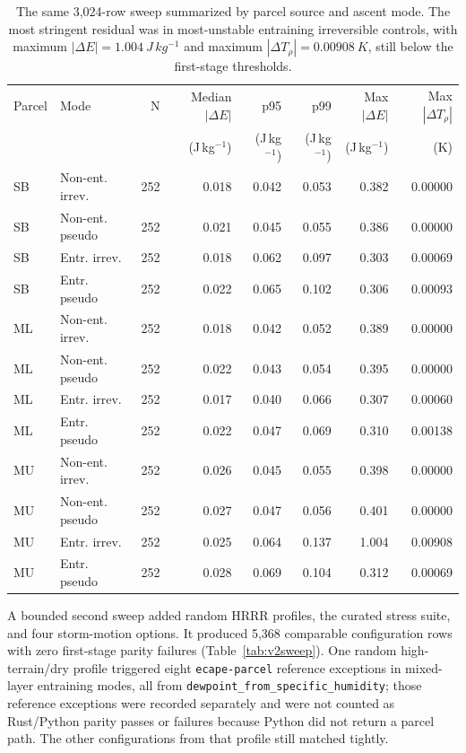 \documentclass[11pt]{article}
\begin{document}
\begin{table}[H]
\centering
\scriptsize
\setlength{\tabcolsep}{3pt}
\caption{The same 3,024-row sweep summarized by parcel source and ascent mode. The most stringent residual was in most-unstable entraining irreversible controls, with maximum $|\Delta E|=\SI{1.004}{J\,kg^{-1}}$ and maximum $|\Delta T_\rho|=\SI{0.00908}{K}$, still below the first-stage thresholds.}
\label{tab:bymode}
\begin{tabular}{llrrrrrr}
\toprule
Parcel & Mode & N & Median $|\Delta E|$ & p95 & p99 & Max $|\Delta E|$ & Max $|\Delta T_\rho|$ \\
 & & & (J\,kg$^{-1}$) & (J\,kg$^{-1}$) & (J\,kg$^{-1}$) & (J\,kg$^{-1}$) & (K) \\
\midrule
SB & Non-ent. irrev. & 252 & 0.018 & 0.042 & 0.053 & 0.382 & 0.00000 \\
SB & Non-ent. pseudo & 252 & 0.021 & 0.045 & 0.055 & 0.386 & 0.00000 \\
SB & Entr. irrev. & 252 & 0.018 & 0.062 & 0.097 & 0.303 & 0.00069 \\
SB & Entr. pseudo & 252 & 0.022 & 0.065 & 0.102 & 0.306 & 0.00093 \\
ML & Non-ent. irrev. & 252 & 0.018 & 0.042 & 0.052 & 0.389 & 0.00000 \\
ML & Non-ent. pseudo & 252 & 0.022 & 0.043 & 0.054 & 0.395 & 0.00000 \\
ML & Entr. irrev. & 252 & 0.017 & 0.040 & 0.066 & 0.307 & 0.00060 \\
ML & Entr. pseudo & 252 & 0.022 & 0.047 & 0.069 & 0.310 & 0.00138 \\
MU & Non-ent. irrev. & 252 & 0.026 & 0.045 & 0.055 & 0.398 & 0.00000 \\
MU & Non-ent. pseudo & 252 & 0.027 & 0.047 & 0.056 & 0.401 & 0.00000 \\
MU & Entr. irrev. & 252 & 0.025 & 0.064 & 0.137 & 1.004 & 0.00908 \\
MU & Entr. pseudo & 252 & 0.028 & 0.069 & 0.104 & 0.312 & 0.00069 \\
\bottomrule
\end{tabular}
\end{table}

A bounded second sweep added random HRRR profiles, the curated stress suite, and four storm-motion options. It produced 5,368 comparable configuration rows with zero first-stage parity failures (Table~\ref{tab:v2sweep}). One random high-terrain/dry profile triggered eight \texttt{ecape-parcel} reference exceptions in mixed-layer entraining modes, all from \texttt{dewpoint\_from\_specific\_humidity}; those reference exceptions were recorded separately and were not counted as Rust/Python parity passes or failures because Python did not return a parcel path. The other configurations from that profile still matched tightly.
\end{document}
